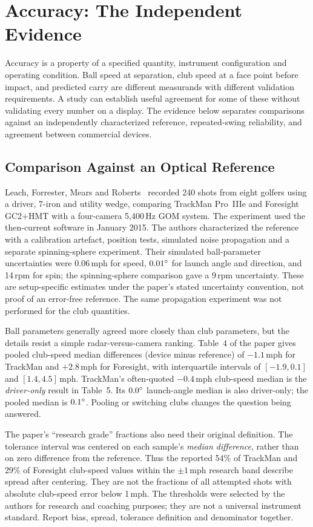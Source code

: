 \chapter{Accuracy: The Independent Evidence}
\label{ch:accuracy}

Accuracy is a property of a specified quantity, instrument configuration and operating condition.
Ball speed at separation, club speed at a face point before impact, and predicted carry are different measurands with different validation requirements.
A study can establish useful agreement for some of these without validating every number on a display.
The evidence below separates comparisons against an independently characterized reference, repeated-swing reliability, and agreement between commercial devices.

\section{Comparison Against an Optical Reference}

Leach, Forrester, Mears and Roberts~\cite{leach2017} recorded 240 shots from eight golfers using a driver, 7-iron and utility wedge, comparing TrackMan Pro~IIIe and Foresight GC2+HMT with a four-camera 5,400\,Hz GOM system.
The experiment used the then-current software in January 2015.
The authors characterized the reference with a calibration artefact, position tests, simulated noise propagation and a separate spinning-sphere experiment.
Their simulated ball-parameter uncertainties were 0.06\,mph for speed, $0.01\si{\degree}$ for launch angle and direction, and 14\,rpm for spin; the spinning-sphere comparison gave a 9\,rpm uncertainty.
These are setup-specific estimates under the paper's stated uncertainty convention, not proof of an error-free reference.
The same propagation experiment was not performed for the club quantities.

Ball parameters generally agreed more closely than club parameters, but the details resist a simple radar-versus-camera ranking.
Table~4 of the paper gives pooled club-speed median differences (device minus reference) of $-1.1$\,mph for TrackMan and $+2.8$\,mph for Foresight, with interquartile intervals of $[-1.9,0.1]$ and $[1.4,4.5]$\,mph.
TrackMan's often-quoted $-0.4$\,mph club-speed median is the \emph{driver-only} result in Table~5.
Its $0.0\si{\degree}$ launch-angle median is also driver-only; the pooled median is $0.1\si{\degree}$.
Pooling or switching clubs changes the question being answered.

The paper's ``research grade'' fractions also need their original definition.
The tolerance interval was centered on each sample's \emph{median difference}, rather than on zero difference from the reference.
Thus the reported 54\% of TrackMan and 29\% of Foresight club-speed values within the $\pm1$\,mph research band describe spread after centering.
They are not the fractions of all attempted shots with absolute club-speed error below 1\,mph.
The thresholds were selected by the authors for research and coaching purposes; they are not a universal instrument standard.
Report bias, spread, tolerance definition and denominator together.

